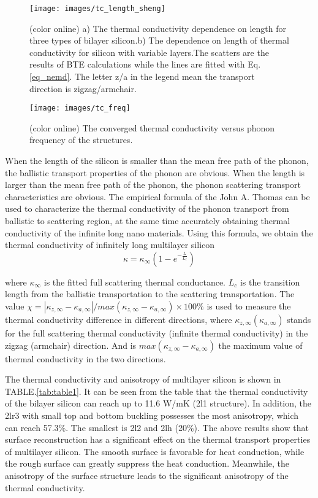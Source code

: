 \documentclass[%
 reprint,
 amsmath,amssymb,
 aps,
 prb,
]{revtex4-1}
\begin{document}
\begin{figure}[b]
  \texttt{[image: images/tc\_length\_sheng]}
  \caption{\label{fig:tc_length_sheng} (color online) a) The thermal conductivity dependence on length for three types of bilayer silicon.b) The dependence on length of thermal conductivity for silicon with variable layers.The scatters are the results of BTE calculations while the lines are fitted with Eq.\ref{eq_nemd}. The letter z/a in the legend mean the transport direction is zigzag/armchair.}
\end{figure}

\begin{figure}[b]
  \texttt{[image: images/tc\_freq]}
  \caption{\label{fig:tc_freq} (color online)  The converged thermal conductivity versus phonon frequency of the structures. }
\end{figure}

When the length of the silicon is smaller than the mean free path of the phonon, the ballistic transport properties of the phonon are obvious. When the length is larger than the mean free path of the phonon, the phonon scattering transport characteristics are obvious. The empirical formula of the John A. Thomas\cite{Thomas2010} can be used to characterize the thermal conductivity of the phonon transport from ballistic to scattering region, at the same time accurately obtaining thermal conductivity of the infinite long nano materials. Using this formula, we obtain the thermal conductivity of infinitely long multilayer silicon
\begin{equation}
  \kappa = \kappa_\infty (1-e^{-\frac{L}{L_c}})
\end{equation}

where $\kappa_\infty$ is the fitted full scattering thermal conductance. $L_c$ is the transition length from the ballistic transportation to the scattering transportation. The value $ \chi=|\kappa_{z,\infty}-\kappa_{a,\infty} |/max⁡(\kappa_{z,\infty}-\kappa_{a,\infty} ) \times 100 \%$ is used to measure the thermal conductivity difference in different directions, where $ \kappa_{z,\infty} (\kappa_{a,\infty})$ stands for the full scattering thermal conductivity (infinite thermal conductivity) in the zigzag (armchair) direction. And is $ max⁡(\kappa_{z,\infty}-\kappa_{a,\infty} ) $ the maximum value of thermal conductivity in the two directions.

The thermal conductivity and anisotropy of multilayer silicon is shown in TABLE.\ref{tab:table1}. It can be seen from the table that the thermal conductivity of the bilayer silicon can reach up to 11.6 W/mK (2l1 structure). In addition, the 2lr3 with small top and bottom buckling possesses the most anisotropy, which can reach 57.3\%. The smallest is 2l2 and 2lh (20\%). The above results show that surface reconstruction has a significant effect on the thermal transport properties of multilayer silicon. The smooth surface is favorable for heat conduction, while the rough surface can greatly suppress the heat conduction. Meanwhile, the anisotropy of the surface structure leads to the significant anisotropy of the thermal conductivity.
\end{document}
